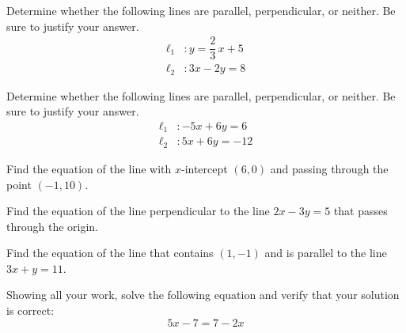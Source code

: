 \documentclass[11pt,letterpaper]{article}
\begin{document}

 Determine whether the following lines are parallel, perpendicular, or neither. Be sure to justify your answer. 
	\[
	\begin{aligned}
	\ell_1 &\colon y= \dfrac{2}{3}\,x + 5 \\
	\ell_2 &\colon 3x - 2y= 8
	\end{aligned}
	\]



\newpage



 Determine whether the following lines are parallel, perpendicular, or neither. Be sure to justify your answer. 
	\[
	\begin{aligned}
	\ell_1 &\colon -5x + 6y= 6 \\
	\ell_2 &\colon 5x + 6y= -12
	\end{aligned}
	\]



\newpage



 Find the equation of the line with $x$-intercept $(6, 0)$ and passing through the point $(-1, 10)$. 



\newpage



 Find the equation of the line perpendicular to the line $2x - 3y= 5$ that passes through the origin. 



\newpage



 Find the equation of the line that contains $(1, -1)$ and is parallel to the line $3x + y= 11$. 



\newpage



 Showing all your work, solve the following equation and verify that your solution is correct:
	\[
	5x - 7= 7 - 2x
	\]



\newpage
\end{document}
